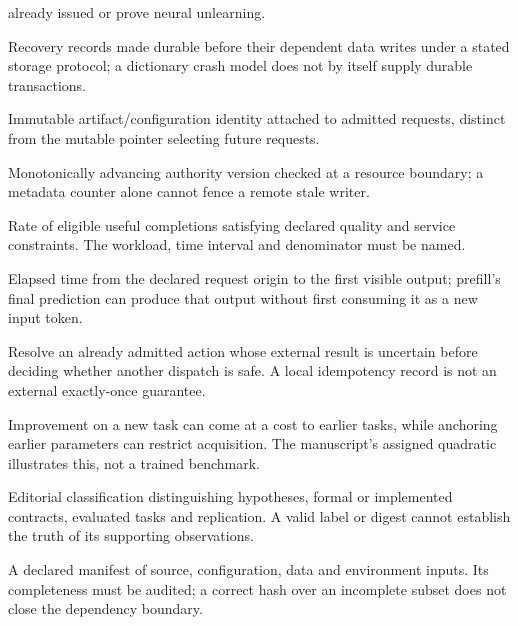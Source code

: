 \begin{description}
already issued or prove neural unlearning.
\item[Write-ahead log] Recovery records made durable before their dependent
data writes under a stated storage protocol; a dictionary crash model does not
by itself supply durable transactions.
\item[Serving revision] Immutable artifact/configuration identity attached to
admitted requests, distinct from the mutable pointer selecting future requests.
\item[Ownership epoch] Monotonically advancing authority version checked at a
resource boundary; a metadata counter alone cannot fence a remote stale writer.
\item[Goodput] Rate of eligible useful completions satisfying declared quality
and service constraints. The workload, time interval and denominator must be named.
\item[Time to first token] Elapsed time from the declared request origin to the
first visible output; prefill's final prediction can produce that output without
first consuming it as a new input token.
\item[Reconciliation] Resolve an already admitted action whose external result
is uncertain before deciding whether another dispatch is safe. A local idempotency
record is not an external exactly-once guarantee.
\item[Acquisition--retention tradeoff] Improvement on a new task can come at a
cost to earlier tasks, while anchoring earlier parameters can restrict acquisition.
The manuscript's assigned quadratic illustrates this, not a trained benchmark.
\item[Evidence level] Editorial classification distinguishing hypotheses,
formal or implemented contracts, evaluated tasks and replication. A valid label
or digest cannot establish the truth of its supporting observations.
\item[Reproducibility capsule] A declared manifest of source, configuration,
data and environment inputs. Its completeness must be audited; a correct hash
over an incomplete subset does not close the dependency boundary.
\end{description}
